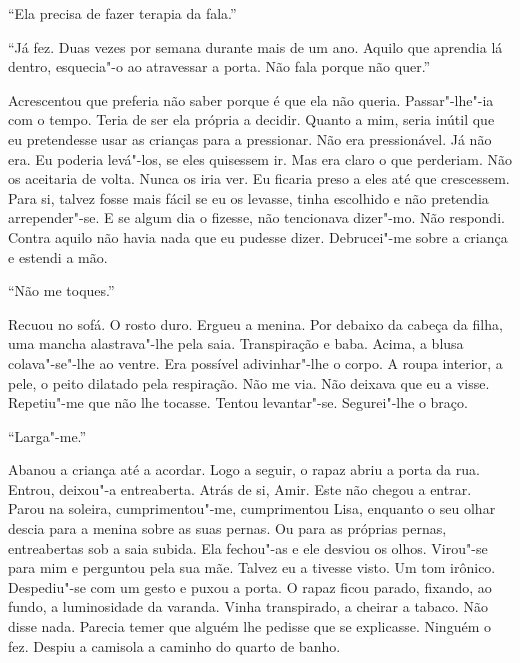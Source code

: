 ``Ela precisa de fazer terapia da fala.''

``Já fez. Duas vezes por semana durante mais de um ano. Aquilo que
aprendia lá dentro, esquecia"-o ao atravessar a porta. Não fala porque
não quer.''

Acrescentou que preferia não saber porque é que ela não queria.
Passar"-lhe"-ia com o tempo. Teria de ser ela própria a decidir. Quanto
a mim, seria inútil que eu pretendesse usar as crianças para a
pressionar. Não era pressionável. Já não era. Eu poderia levá"-los, se
eles quisessem ir. Mas era claro o que perderiam. Não os aceitaria de
volta. Nunca os iria ver. Eu ficaria preso a eles até que crescessem.
Para si, talvez fosse mais fácil se eu os levasse, tinha escolhido e não
pretendia arrepender"-se. E se algum dia o fizesse, não tencionava
dizer"-mo. Não respondi. Contra aquilo não havia nada que eu pudesse
dizer. Debrucei"-me sobre a criança e estendi a mão.

``Não me toques.''

Recuou no sofá. O rosto duro. Ergueu a menina. Por debaixo da cabeça da
filha, uma mancha alastrava"-lhe pela saia. Transpiração e baba. Acima,
a blusa colava"-se"-lhe ao ventre. Era possível adivinhar"-lhe o corpo.
A roupa interior, a pele, o peito dilatado pela respiração. Não me via.
Não deixava que eu a visse. Repetiu"-me que não lhe tocasse. Tentou
levantar"-se. Segurei"-lhe o braço.

``Larga"-me.''

Abanou a criança até a acordar. Logo a seguir, o rapaz abriu a porta da
rua. Entrou, deixou"-a entreaberta. Atrás de si, Amir. Este não chegou a
entrar. Parou na soleira, cumprimentou"-me, cumprimentou Lisa, enquanto
o seu olhar descia para a menina sobre as suas pernas. Ou para as
próprias pernas, entreabertas sob a saia subida. Ela fechou"-as e ele
desviou os olhos. Virou"-se para mim e perguntou pela sua mãe. Talvez eu
a tivesse visto. Um tom irônico. Despediu"-se com um gesto e puxou a
porta. O rapaz ficou parado, fixando, ao fundo, a luminosidade da
varanda. Vinha transpirado, a cheirar a tabaco. Não disse nada. Parecia
temer que alguém lhe pedisse que se explicasse. Ninguém o fez. Despiu a
camisola a caminho do quarto de banho.

